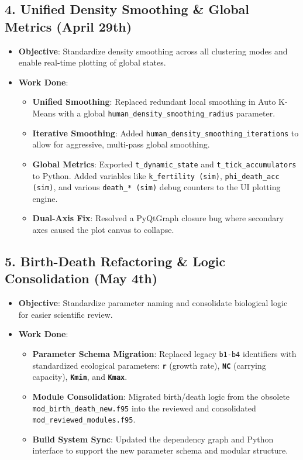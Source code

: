 \subsection{4. Unified Density Smoothing \& Global Metrics (April 29th)}
\begin{itemize}
\item \textbf{Objective}: Standardize density smoothing across all clustering modes and enable real-time plotting of global states.
\item \textbf{Work Done}:
\begin{itemize}
\item \textbf{Unified Smoothing}: Replaced redundant local smoothing in Auto K-Means with a global \texttt{human\_density\_smoothing\_radius} parameter.
\item \textbf{Iterative Smoothing}: Added \texttt{human\_density\_smoothing\_iterations} to allow for aggressive, multi-pass global smoothing.
\item \textbf{Global Metrics}: Exported \texttt{t\_dynamic\_state} and \texttt{t\_tick\_accumulators} to Python. Added variables like \texttt{k\_fertility (sim)}, \texttt{phi\_death\_acc (sim)}, and various \texttt{death\_* (sim)} debug counters to the UI plotting engine.
\item \textbf{Dual-Axis Fix}: Resolved a PyQtGraph closure bug where secondary axes caused the plot canvas to collapse.
\end{itemize}
\end{itemize}

\subsection{5. Birth-Death Refactoring \& Logic Consolidation (May 4th)}
\begin{itemize}
\item \textbf{Objective}: Standardize parameter naming and consolidate biological logic for easier scientific review.
\item \textbf{Work Done}:
\begin{itemize}
\item \textbf{Parameter Schema Migration}: Replaced legacy \texttt{b1-b4} identifiers with standardized ecological parameters: \textbf{\texttt{r}} (growth rate), \textbf{\texttt{NC}} (carrying capacity), \textbf{\texttt{Kmin}}, and \textbf{\texttt{Kmax}}.
\item \textbf{Module Consolidation}: Migrated birth/death logic from the obsolete \texttt{mod\_birth\_death\_new.f95} into the reviewed and consolidated \texttt{mod\_reviewed\_modules.f95}.
\item \textbf{Build System Sync}: Updated the dependency graph and Python interface to support the new parameter schema and modular structure.
\end{itemize}
\end{itemize}

